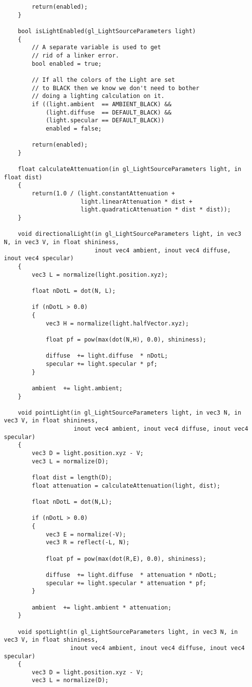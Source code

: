 \begin{verbatim}
		return(enabled);
	}

	bool isLightEnabled(gl_LightSourceParameters light)
	{
		// A separate variable is used to get
		// rid of a linker error.
		bool enabled = true;
	   
		// If all the colors of the Light are set
		// to BLACK then we know we don't need to bother
		// doing a lighting calculation on it.
		if ((light.ambient  == AMBIENT_BLACK) &&
			(light.diffuse  == DEFAULT_BLACK) &&
			(light.specular == DEFAULT_BLACK))
			enabled = false;
	       
		return(enabled);
	}

	float calculateAttenuation(in gl_LightSourceParameters light, in float dist)
	{
		return(1.0 / (light.constantAttenuation +
					  light.linearAttenuation * dist +
					  light.quadraticAttenuation * dist * dist));
	}

	void directionalLight(in gl_LightSourceParameters light, in vec3 N, in vec3 V, in float shininess,
						  inout vec4 ambient, inout vec4 diffuse, inout vec4 specular)
	{
		vec3 L = normalize(light.position.xyz);
	   
		float nDotL = dot(N, L);
	   
		if (nDotL > 0.0)
		{   
			vec3 H = normalize(light.halfVector.xyz);
	       
			float pf = pow(max(dot(N,H), 0.0), shininess);

			diffuse  += light.diffuse  * nDotL;
			specular += light.specular * pf;
		}
	   
		ambient  += light.ambient;
	}
	
	void pointLight(in gl_LightSourceParameters light, in vec3 N, in vec3 V, in float shininess,
					inout vec4 ambient, inout vec4 diffuse, inout vec4 specular)
	{
		vec3 D = light.position.xyz - V;
		vec3 L = normalize(D);

		float dist = length(D);
		float attenuation = calculateAttenuation(light, dist);

		float nDotL = dot(N,L);

		if (nDotL > 0.0)
		{   
			vec3 E = normalize(-V);
			vec3 R = reflect(-L, N);
	       
			float pf = pow(max(dot(R,E), 0.0), shininess);

			diffuse  += light.diffuse  * attenuation * nDotL;
			specular += light.specular * attenuation * pf;
		}
	   
		ambient  += light.ambient * attenuation;
	}

	void spotLight(in gl_LightSourceParameters light, in vec3 N, in vec3 V, in float shininess,
				   inout vec4 ambient, inout vec4 diffuse, inout vec4 specular)
	{
		vec3 D = light.position.xyz - V;
		vec3 L = normalize(D);


\end{verbatim}
